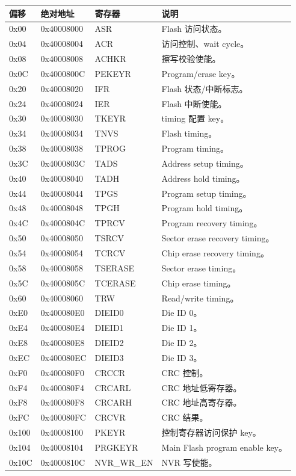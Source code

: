 \documentclass[UTF8,a4paper,11pt]{ctexart}
\begin{document}
\begin{longtable}{>{\ttfamily}p{2cm}>{\ttfamily}p{3cm}p{2.6cm}p{6cm}}
\toprule
偏移 & 绝对地址 & 寄存器 & 说明 \\
\midrule
\endhead
0x00 & 0x40008000 & ASR & Flash 访问状态。\\
0x04 & 0x40008004 & ACR & 访问控制、wait cycle。\\
0x08 & 0x40008008 & ACHKR & 擦写校验使能。\\
0x0C & 0x4000800C & PEKEYR & Program/erase key。\\
0x20 & 0x40008020 & IFR & Flash 状态/中断标志。\\
0x24 & 0x40008024 & IER & Flash 中断使能。\\
0x30 & 0x40008030 & TKEYR & timing 配置 key。\\
0x34 & 0x40008034 & TNVS & Flash timing。\\
0x38 & 0x40008038 & TPROG & Program timing。\\
0x3C & 0x4000803C & TADS & Address setup timing。\\
0x40 & 0x40008040 & TADH & Address hold timing。\\
0x44 & 0x40008044 & TPGS & Program setup timing。\\
0x48 & 0x40008048 & TPGH & Program hold timing。\\
0x4C & 0x4000804C & TPRCV & Program recovery timing。\\
0x50 & 0x40008050 & TSRCV & Sector erase recovery timing。\\
0x54 & 0x40008054 & TCRCV & Chip erase recovery timing。\\
0x58 & 0x40008058 & TSERASE & Sector erase timing。\\
0x5C & 0x4000805C & TCERASE & Chip erase timing。\\
0x60 & 0x40008060 & TRW & Read/write timing。\\
0xE0 & 0x400080E0 & DIEID0 & Die ID 0。\\
0xE4 & 0x400080E4 & DIEID1 & Die ID 1。\\
0xE8 & 0x400080E8 & DIEID2 & Die ID 2。\\
0xEC & 0x400080EC & DIEID3 & Die ID 3。\\
0xF0 & 0x400080F0 & CRCCR & CRC 控制。\\
0xF4 & 0x400080F4 & CRCARL & CRC 地址低寄存器。\\
0xF8 & 0x400080F8 & CRCARH & CRC 地址高寄存器。\\
0xFC & 0x400080FC & CRCVR & CRC 结果。\\
0x100 & 0x40008100 & PKEYR & 控制寄存器访问保护 key。\\
0x104 & 0x40008104 & PRGKEYR & Main Flash program enable key。\\
0x10C & 0x4000810C & NVR\_WR\_EN & NVR 写使能。\\
\bottomrule
\end{longtable}
\end{document}
